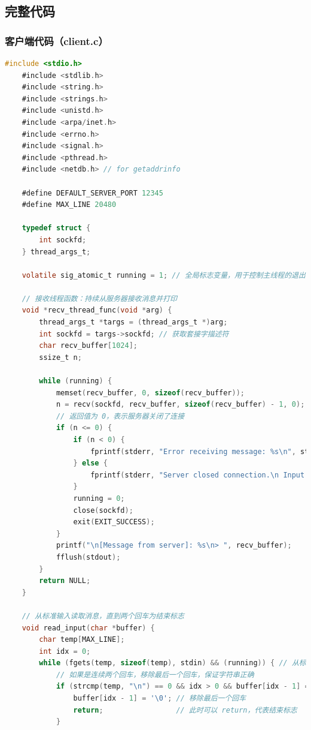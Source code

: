 \documentclass[14pt,a4paper,UTF8,twoside]{article}
\begin{document}
\subsection{完整代码}

\subsubsection{客户端代码（client.c）}

\begin{lstlisting}[language=C]
    #include <stdio.h>
    #include <stdlib.h>
    #include <string.h>
    #include <strings.h>
    #include <unistd.h>
    #include <arpa/inet.h>
    #include <errno.h>
    #include <signal.h>
    #include <pthread.h>
    #include <netdb.h> // for getaddrinfo
    
    #define DEFAULT_SERVER_PORT 12345
    #define MAX_LINE 20480
    
    typedef struct {
        int sockfd;
    } thread_args_t;
    
    volatile sig_atomic_t running = 1; // 全局标志变量，用于控制主线程的退出
    
    // 接收线程函数：持续从服务器接收消息并打印
    void *recv_thread_func(void *arg) {
        thread_args_t *targs = (thread_args_t *)arg;
        int sockfd = targs->sockfd; // 获取套接字描述符
        char recv_buffer[1024];
        ssize_t n;
    
        while (running) {
            memset(recv_buffer, 0, sizeof(recv_buffer));
            n = recv(sockfd, recv_buffer, sizeof(recv_buffer) - 1, 0); // 0 表示阻塞接收模式
            // 返回值为 0，表示服务器关闭了连接
            if (n <= 0) {
                if (n < 0) {
                    fprintf(stderr, "Error receiving message: %s\n", strerror(errno));
                } else {
                    fprintf(stderr, "Server closed connection.\n Input anything and <Enter> to exit.");
                }
                running = 0;
                close(sockfd);
                exit(EXIT_SUCCESS);
            }
            printf("\n[Message from server]: %s\n> ", recv_buffer);
            fflush(stdout);
        }
        return NULL;
    }
    
    // 从标准输入读取消息，直到两个回车为结束标志
    void read_input(char *buffer) {
        char temp[MAX_LINE];
        int idx = 0;
        while (fgets(temp, sizeof(temp), stdin) && (running)) { // 从标准输入流中读取
            // 如果是连续两个回车，移除最后一个回车，保证字符串正确
            if (strcmp(temp, "\n") == 0 && idx > 0 && buffer[idx - 1] == '\n') {
                buffer[idx - 1] = '\0'; // 移除最后一个回车
                return;                 // 此时可以 return，代表结束标志
            }
    

\end{lstlisting}
\end{document}
